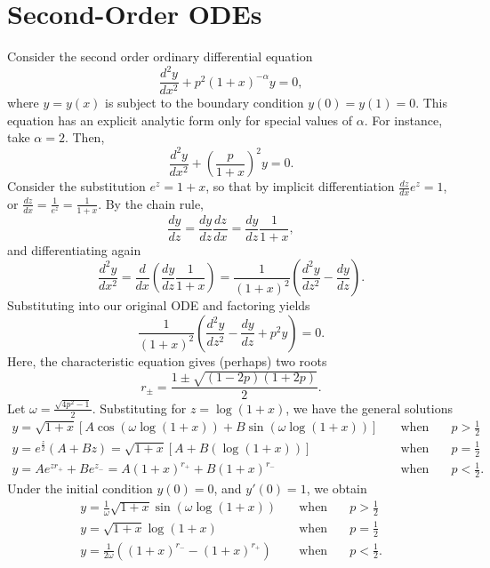 \documentclass{article}
\begin{document}
\section{Second-Order ODEs}

Consider the second order ordinary differential equation
\[ \frac{d^2y}{dx^2} + p^2(1+x)^{-\alpha}y = 0, \]
where \(y = y(x)\) is subject to the boundary condition \(y(0) = y(1) = 0\). This equation has an explicit analytic form only for special values of \(\alpha\). For instance, take \(\alpha = 2\). Then,
\[ \frac{d^2y}{dx^2} + \left(\frac{p}{1+x}\right)^2y = 0. \]
Consider the substitution \(e^z = 1+x\), so that by implicit differentiation \(\frac{dz}{dx}e^z = 1\), or \(\frac{dz}{dx} = \frac{1}{e^z} = \frac{1}{1+x}\). By the chain rule,
\[ \frac{dy}{dz} = \frac{dy}{dz} \frac{dz}{dx} = \frac{dy}{dz} \frac{1}{1+x}, \]
and differentiating again
\[ \frac{d^2y}{dx^2} = \frac{d}{dx}\left(\frac{dy}{dz} \frac{1}{1+x}\right) = \frac{1}{(1+x)^2}\left(\frac{d^2y}{dz^2} - \frac{dy}{dz}\right). \]
Substituting into our original ODE and factoring yields
\[ \frac{1}{(1+x)^2}\left(\frac{d^2y}{dz^2} - \frac{dy}{dz} + p^2y\right) = 0. \]
Here, the characteristic equation gives (perhaps) two roots
\[ r_{\pm} = \frac{1 \pm \sqrt{(1-2p)(1+2p)}}{2}. \]
Let \(\omega = \frac{\sqrt{4p^2-1}}{2}\). Substituting for \(z = \log(1+x)\), we have the general solutions
\begin{eqnarray*}
    y = \sqrt{1+x}[A\cos(\omega\log(1+x)) + B\sin(\omega\log(1+x))] & \quad \mbox{when} & \quad p > \frac{1}{2}\\
    y = e^{\frac{z}{2}}(A + Bz) = \sqrt{1+x}[A + B(\log(1+x))] & \quad \mbox{when} & \quad p = \frac{1}{2}\\
    y = Ae^{zr_+} + Be^{z_-} = A(1+x)^{r_+} + B(1+x)^{r_-} & \quad \mbox{when} & \quad p < \frac{1}{2}.
\end{eqnarray*}
Under the initial condition \(y(0) = 0\), and \(y'(0) = 1\),  we obtain
\begin{eqnarray*}
    y = \frac{1}{\omega}\sqrt{1+x}\sin(\omega\log(1+x)) & \quad \mbox{when} & \quad p > \frac{1}{2}\\
    y = \sqrt{1+x}\log(1+x) & \quad \mbox{when} & \quad p = \frac{1}{2}\\
    y = \frac{1}{2\omega}((1+x)^{r_-} - (1+x)^{r_+}) & \quad \mbox{when} & \quad p < \frac{1}{2}.
\end{eqnarray*}
\end{document}
